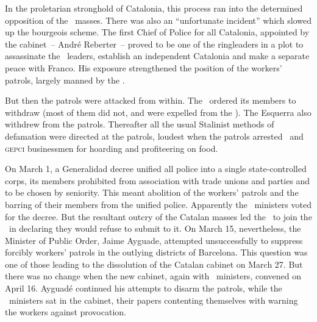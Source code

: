 In the proletarian stronghold of Catalonia, this process ran into the determined opposition of the \CNT\ masses. There was also an ``unfortunate incident'' which slowed up the bourgeois scheme. The first Chief of Police for all Catalonia, appointed by the cabinet~-- Andr\'e Reberter~-- proved to be one of the ringleaders in a plot to assassinate the \CNT\ leaders, establish an independent Catalonia and make a separate peace with Franco. His exposure strengthened the position of the workers’ patrols, largely manned by the \CNT\kn.
\nowidow

But then the patrols were attacked from within. The \PSUC\ ordered its members to withdraw (most of them did not, and were expelled from the \PSUC). The Esquerra also withdrew from the patrols. Thereafter all the usual Stalinist methods of defamation were directed at the patrols, loudest when the patrols arrested \PSUC\ and \textsc{gepci} businessmen for hoarding and profiteering on food.

On March 1, a Generalidad decree unified all police into a single state-controlled corps, its members prohibited from association with trade unions and parties and to be chosen by seniority. This meant abolition of the workers’ patrols and the barring of their members from the unified police. Apparently the \CNT\ ministers voted for the decree. But the resultant outcry of the Catalan masses led the \CNT\ to join the \POUM\ in declaring they would refuse to submit to it. On March 15, nevertheless, the Minister of Public Order, Jaime Ayguade, attempted unsuccessfully to suppress forcibly workers’ patrols in the outlying districts of Barcelona. This question was one of those leading to the dissolution of the Catalan cabinet on March 27. But there was no change when the new cabinet, again with \CNT\ ministers, convened on April 16. Ayguad\'e continued his attempts to disarm the patrols, while the \CNT\ ministers sat in the cabinet, their papers contenting themselves with warning the workers against provocation.

